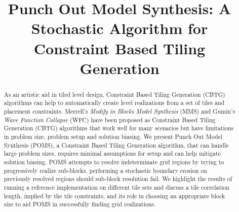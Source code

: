 \documentclass[
twocolumn,
]{ceurart}
\begin{document}



\title{ Punch Out Model Synthesis: A Stochastic Algorithm for Constraint Based Tiling Generation}



\begin{abstract}
  As an artistic aid in tiled level design, Constraint Based Tiling Generation (CBTG) algorithms can help
  to automatically create level realizations from a set of tiles and placement constraints.
  Merrell's \textit{Modify in Blocks Model Synthesis} (MMS) and Gumin's \textit{Wave Function Collapse} (WFC) have been proposed
  as Constraint Based Tiling Generation (CBTG) algorithms that work well for many scenarios but have limitations
  in problem size, problem setup and solution biasing.
  We present Punch Out Model Synthesis (POMS), a Constraint Based Tiling Generation algorithm,
  that can handle large problem sizes, requires minimal assumptions
  for setup and can help mitigate solution biasing.
  POMS attempts to resolve indeterminate grid regions by trying to progressively realize sub-blocks, performing a
  stochastic boundary erosion on previously resolved regions should sub-block resolution fail.
  We highlight the results of running a reference implementation on different tile sets and
  discuss a tile correlation length, implied by the tile constraints, and its role in choosing
  an appropriate block size to aid POMS in successfully finding grid realizations.
\end{abstract}

\maketitle

\newcommand{\specialcell}[2][c]{\begin{tabular}[#1]{@{}l@{}}#2\end{tabular}}
\newcommand{\specialcellCenter}[2][c]{\begin{tabular}[#1]{@{}c@{}}#2\end{tabular}}









%


\appendix

\end{document}
